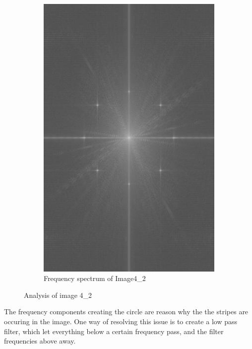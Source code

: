 \begin{figure}[H]
\begin{subfigure}[b]{0.23\textwidth}
        \label{fig:img42_src}
    \end{subfigure}
    \begin{subfigure}[b]{0.23\textwidth}
        \includegraphics[width=\textwidth]{img4/Image4_2_freq_spec.png}
        \caption{Frequency spectrum of Image4\_2}
        \label{fig:img1_hist}
    \end{subfigure}
    \caption{Analysis of image 4\_2}\label{fig:img1}
\end{figure}

The frequency components creating the circle are reason why the the stripes are occuring in the image.  One way of resolving this issue is to create a low pass filter, which let everything below a certain frequency pass, and the filter frequencies above away. \\

